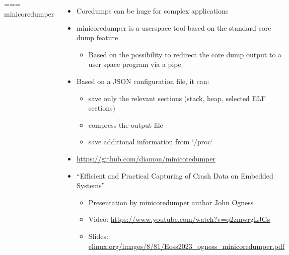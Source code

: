 \begin{columns}[T]
=== minicoredumper
  \begin{itemize}
  \item Coredumps can be huge for complex applications
  \item minicoredumper is a userspace tool based on the standard core dump
    feature
    \begin{itemize}
    \item Based on the possibility to redirect the core dump output to a
      user space program via a pipe
    \end{itemize}
  \item Based on a JSON configuration file, it can:
    \begin{itemize}
    \item save only the relevant sections (stack, heap, selected ELF
      sections)
    \item compress the output file
    \item save additional information from `/proc`
    \end{itemize}
  \item \url{https://github.com/diamon/minicoredumper}
  \item ``Efficient and Practical Capturing of Crash Data on Embedded
    Systems''
    \begin{itemize}
      \item Presentation by minicoredumper author John Ogness
      \item Video: \url{https://www.youtube.com/watch?v=q2zmwrgLJGs}
      \item Slides:
        \href{https://elinux.org/images/8/81/Eoss2023_ogness_minicoredumper.pdf}
             {elinux.org/images/8/81/Eoss2023\_ogness\_minicoredumper.pdf}
    \end{itemize}
  \end{itemize}
\end{columns}